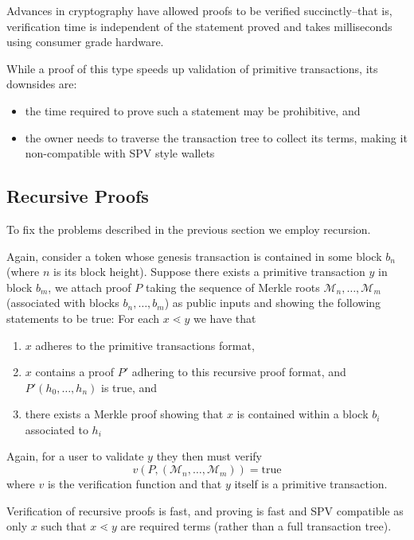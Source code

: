 \documentclass[9pt,oneside]{amsart}
\begin{document}
\begin{multicols}{2}
Advances in cryptography have allowed proofs to be verified succinctly--that is, verification time is independent of the statement proved and takes milliseconds using consumer grade hardware.


While a proof of this type speeds up validation of primitive transactions, its downsides are:
\begin{itemize}
    \item the time required to prove such a statement may be prohibitive, and
    \item the owner needs to traverse the transaction tree to collect its terms, making it non-compatible with SPV style wallets
\end{itemize}

\subsection{Recursive Proofs}
To fix the problems described in the previous section we employ recursion. 

Again, consider a token whose genesis transaction is contained in some block $b_{n}$ (where $n$ is its block height). Suppose there exists a primitive transaction $y$ in block $b_{m}$, we attach proof $P$ taking the sequence of Merkle roots $\mathcal{M}_{n}, \dots, \mathcal{M}_{m}$ (associated with blocks $b_{n}, \dots, b_{m}$) as public inputs and showing the following statements to be true:
For each $x \lessdot y$ we have that
\begin{enumerate}
    \item $x$ adheres to the primitive transactions format,
    \item $x$ contains a proof $P'$ adhering to this recursive proof format, and $P'(h_{0}, \dots, h_{n})$ is true, and
    \item there exists a Merkle proof showing that $x$ is contained within a block $b_{i}$ associated to $h_{i}$
\end{enumerate}

Again, for a user to validate $y$ they then must verify
\[v(P, (\mathcal{M}_{n}, \dots, \mathcal{M}_{m})) = \text{true}\] 
where $v$ is the verification function and that $y$ itself is a primitive transaction.

Verification of recursive proofs is fast, and proving is fast and SPV compatible as only $x$ such that $x \lessdot y$ are required terms (rather than a full transaction tree).


\end{multicols}
\end{document}
